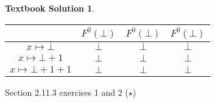 \documentclass[10pt]{article}
\theoremstyle{definition}
\newtheorem{ts}{Textbook Solution}
\begin{document}
    \begin{ts}
    \begin{center}
     \begin{tabular}{||c c c c||} 
     \hline
       & $F^0( \bot )$ & $F^0( \bot )$ & $F^0( \bot )$ \\ [0.5ex] 
     \hline\hline
     ${x\mapsto \bot}$ & $\bot$ & $\bot$ & $\bot$ \\ 
     \hline
     ${x\mapsto \bot + 1 }$ & $\bot$ & $\bot$ & $\bot$ \\
     \hline
     ${x\mapsto \bot + 1 + 1}$ & $\bot$ & $\bot$ & $\bot$ \\
     \hline
    \end{tabular}
    \end{center}
    
    \end{ts}
    
    
    
    Section 2.11.3 exercises 1 and 2 ($\star$)
    
    
    
    
\end{document}
